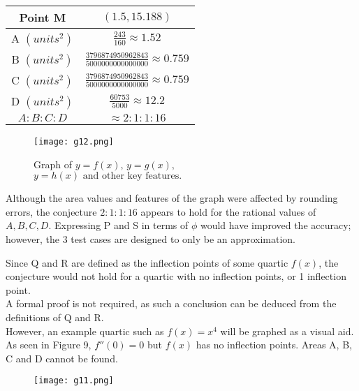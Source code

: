 \documentclass{homework}
\begin{document}
\begin{flushleft}
\begin{paracol}{2}
\begin{tabular}{|c|c|}
      Point M & $\left(1.5,15.188\right)$ \\ \hline 
    A $(units^2)$ & $\frac{243}{160}\approx 1.52$\\ \hline
    B $(units^2)$ & $\frac{3796874950962843}{5000000000000000}\approx 0.759$ \\ \hline
    C $(units^2)$ & $\frac{3796874950962843}{5000000000000000}\approx 0.759$  \\ \hline
    D $(units^2)$ & $\frac{60753}{5000}\approx 12.2$ \\ \hline
    $ A:B:C:D$ & $\approx 2:1:1:16$ \\ \hline
    \end{tabular}
    \endgroup
\switchcolumn
\vspace{2em}
   \begin{figure}[htp]
        \centering
    \texttt{[image: g12.png]} \\
        \caption{Graph of $y=f(x),\, y=g(x),$\\ $y=h(x) \text{ and other key features.}$}
        \label{fig:g12}
    \end{figure}
\end{paracol}
Although the area values and features of the graph were affected by rounding errors, the conjecture $2:1:1:16$ appears to hold for the rational values of $A, B, C, D$. Expressing P and S in terms of $\phi$ would have improved the accuracy; however, the 3 test cases are designed to only be an approximation.
\\
\begin{paracol}{2}
  \vspace{1.2em} Since Q and R are defined as the inflection points of some quartic $f(x)$, the conjecture would not hold for a quartic with no inflection points, or 1 inflection point. \vspace{1em} \\
   A formal proof is not required, as such a conclusion can be deduced from the definitions of Q and R. \vspace{1em} \\
   However, an example quartic such as $f(x)=x^4$ will be graphed as a visual aid. \vspace{1em} \\
   As seen in Figure 9, $f''(0)=0$ but $f(x)$ has no inflection points. Areas A, B, C and D cannot be found.  \\
   \switchcolumn
   \begin{figure}[htp]
    \centering
\texttt{[image: g11.png]} \\

\end{figure}
\end{paracol}
\end{flushleft}
\end{document}
